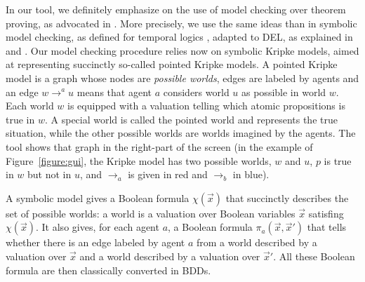 In our tool, we definitely emphasize on the use of model checking over theorem proving, as advocated in \cite{DBLP:conf/kr/HalpernV91}. More precisely, we use the same ideas than in symbolic model checking, as defined for temporal logics \cite{DBLP:conf/lics/BurchCMDH90}, adapted to DEL, as explained in \cite{DBLP:conf/atal/CharrierS17} and \cite{DBLP:conf/aiml/CharrierS18}. Our model checking procedure relies now on symbolic Kripke models, aimed at representing succinctly so-called pointed Kripke models. A pointed Kripke model is a graph whose nodes are \emph{possible worlds}, edges are labeled by agents and an edge $w \rightarrow^a u$ means that agent $a$ considers world $u$ as possible in world $w$. Each world $w$ is equipped with a valuation telling which atomic propositions is true in $w$. A special world is called the pointed world and represents the true situation, while the other possible worlds are worlds imagined by the agents.
The tool shows that graph in the right-part of the screen (in the example of Figure~\ref{figure:gui}, the Kripke model has two possible worlds, $w$ and $u$, $p$ is true in $w$ but not in $u$, and $\rightarrow_a$ is given in red and $\rightarrow_b$ in blue). 


\newcommand{\succinctsetworlds}{\chi}
\newcommand{\succinctrelation}[1]{\pi_{#1}}
 A symbolic model gives a Boolean formula $\succinctsetworlds(\vec x)$ that succinctly  describes the set of possible worlds: a world is a valuation over Boolean variables $\vec x$ satisfing $\succinctsetworlds(\vec x)$. It also gives, for each agent $a$, a Boolean formula $\succinctrelation a(\vec x, \vec x')$ that tells whether there is an edge labeled by agent $a$ from a world described by a valuation over $\vec x$ and  a world described by a valuation over $\vec x'$. All these Boolean formula are then classically converted in BDDs.%


